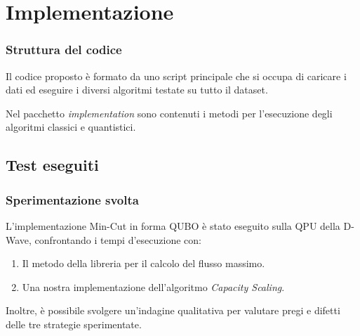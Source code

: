 \documentclass[10pt]{beamer}
\begin{document}
\section{Implementazione}
\begin{frame}
  \frametitle{Struttura del codice}

  Il codice proposto è formato da uno script principale che si occupa di caricare i dati ed eseguire i diversi algoritmi testate su tutto il dataset.

  Nel pacchetto \emph{implementation} sono contenuti i metodi per l'esecuzione degli algoritmi classici e quantistici.

\end{frame}
\subsection{Test eseguiti}
\begin{frame}
  \frametitle{Sperimentazione svolta}

  L'implementazione Min-Cut in forma QUBO è stato eseguito sulla QPU della D-Wave, confrontando i tempi d'esecuzione con:
  
  \begin{enumerate}
    \item Il metodo della libreria per il calcolo del flusso massimo.
    \item Una nostra implementazione dell'algoritmo \emph{Capacity Scaling}.
  \end{enumerate} 

  Inoltre, è possibile svolgere un'indagine qualitativa per valutare pregi e difetti delle tre strategie sperimentate.

\end{frame}
\end{document}
